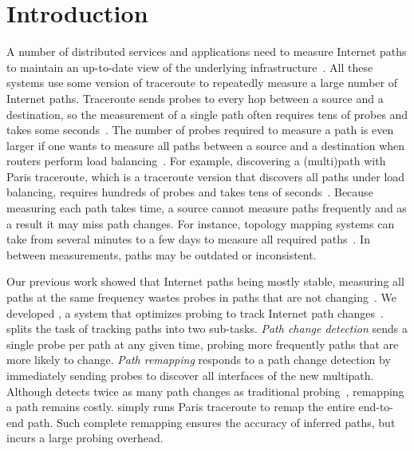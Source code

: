 \section{Introduction}
\label{sec:intro}

A number of distributed services and applications need to measure
Internet paths to maintain an up-to-date view of the underlying
infrastructure~\cite{duffield06binary,
dhamdhere07netdiagnoser,kompella07blackholes,
bassett12lifeguard,akamai,skitter}. All these systems use some version
of traceroute to repeatedly measure a large number of Internet paths.
Traceroute sends probes to every hop between a source and a destination,
so the measurement of a single path often requires tens of probes and
takes some seconds~\cite{veitch09balancer}. The number of probes required
to measure a path is even larger if one wants to measure all paths
between a source and a destination when routers perform load
balancing~\cite{veitch09balancer}. For example, discovering a
(multi)path with Paris traceroute, which is a traceroute version that
discovers all paths under load balancing, requires hundreds of probes
and takes tens of seconds~\cite{veitch09balancer}.\footnotemark{}
Because measuring each path takes time, a source cannot measure paths
frequently and as a result it may miss path changes. For instance,
topology mapping systems can take from several minutes to a few days to
measure all required paths~\cite{cunha11fastmapping, sherwood08discarte,
skitter}.  In between measurements, paths may be outdated or
inconsistent.


Our previous work showed that Internet paths being mostly stable,
measuring all paths at the same frequency wastes probes in paths that
are not changing~\cite{cunha11dtrack}. We developed \dtrack{}, a system
that optimizes probing to track Internet path
changes~\cite{cunha11dtrack}.  \dtrack{} splits the task of tracking
paths into two sub-tasks.  \textit{Path change detection} sends a single
probe per path at any given time, probing more frequently paths that are
more likely to change. \textit{Path remapping} responds to a path change detection
by immediately sending probes to discover all interfaces of the new multipath.
Although \dtrack{} detects twice as many path changes
as traditional probing~\cite{cunha11dtrack}, remapping a path remains
costly.  \dtrack{} simply runs Paris traceroute to remap the entire
end-to-end path. Such complete remapping ensures the accuracy of
inferred paths, but incurs a large probing overhead.

